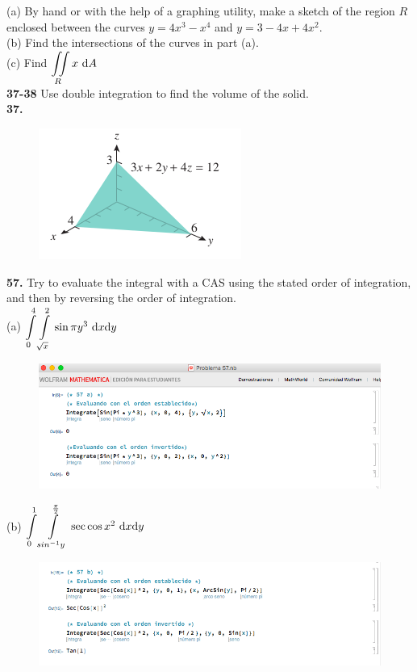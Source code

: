 \documentclass[11pt]{report}
\begin{document}
(a) By hand or with the help of a graphing utility, make a sketch of the region
$R$ enclosed between the curves $y = 4x^3 - x^4$ and $y = 3 - 4x + 4x^2$. \\

(b) Find the intersections of the curves in part (a). \\

(c) Find $ {\displaystyle \iint \limits_R } \, x \, \, \text dA $ \\

\textbf{37-38} Use double integration to find the volume of the solid. \\

\textbf{37.} \\

\begin{figure}[h]
\includegraphics[scale=0.5]{img1.png}
\centering
\end{figure}

\textbf{57.} Try to evaluate the integral with a CAS using the stated order of
integration, and then by reversing the order of integration.\\

(a) $ {\displaystyle \int \limits_0^4 \int \limits_{\sqrt{x}}^2 } \, \sin{\pi y^3} \, \, \text dx \text dy $ \\
\begin{figure}[h]
\includegraphics[scale=0.5]{img4.png}
\centering
\end{figure}

(b) $ {\displaystyle \int \limits_0^1 \int \limits_{sin^{-1}y}^{\frac{\pi}{2}} } \, \sec{\cos{x}}^2 \, \, \text dx \text dy $ \\
\begin{figure}[h]
\includegraphics[scale=0.5]{img3.png}
\centering
\end{figure}
\end{document}
